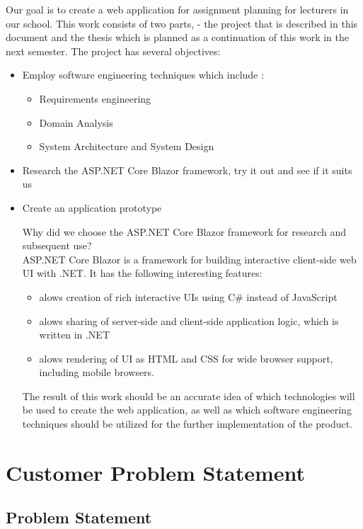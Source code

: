 \documentclass{scrartcl}
\begin{document}
Our goal is to create a web application for assignment planning for lecturers in our school. 
This work consists of two parts, - the project that is described in this document and the thesis which is planned as a continuation of this work in the next semester.
The project has several objectives:
\begin{itemize}
\item Employ software engineering techniques which include :
	\begin{itemize}
	\item Requirements engineering
	\item Domain Analysis
	\item System Architecture and System Design
	
	\end{itemize}
\item Research the ASP.NET Core Blazor framework, try it out and see if it suits us 
\item Create an application prototype

Why did we choose the ASP.NET Core Blazor framework for research and subsequent use?\\
ASP.NET Core Blazor is a framework for building interactive client-side web UI with .NET.  It has the following interesting features: \cite{blazor}
\begin{itemize}
\item alows creation of  rich interactive UIs using C\# instead of JavaScript
\item alows sharing of server-side and client-side application logic, which is written in .NET
\item alows rendering of UI as HTML and CSS for wide browser support, including mobile browsers.
\end{itemize}

The result of this work should be an accurate idea of which technologies will be used to create the web application, as well as which software engineering techniques should be utilized for the further implementation of the product.

\end{itemize}





\section{Customer Problem Statement}

\subsection{Problem Statement}
\end{document}
